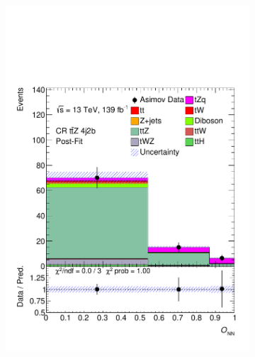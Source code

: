 \begin{figure}[!h] 
  \begin{subfigure}[b]{0.33\linewidth}
    \centering
    \includegraphics[width=\textwidth]{ubonn-thesis/Chapters/Chapters_07/Figure/Asmiov/CR_4j2b_postFit.pdf} 
    \caption{}
  \end{subfigure}%
  \begin{subfigure}[b]{0.33\linewidth}
    \centering

\end{subfigure}
\end{figure}
